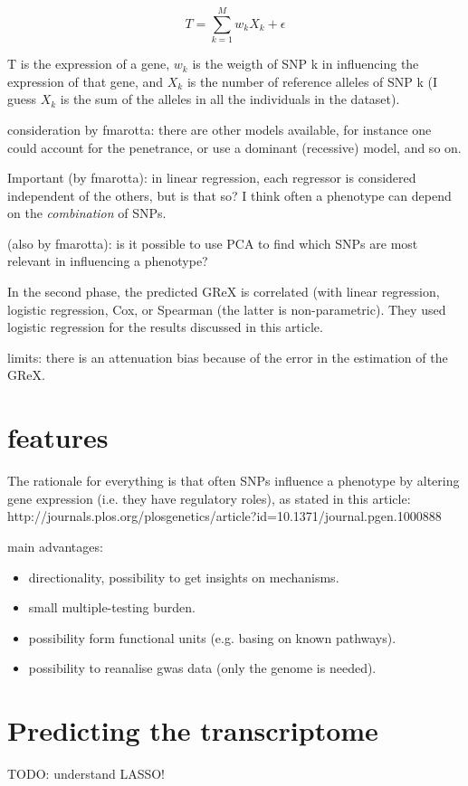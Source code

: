 \documentclass[../main.tex]{subfiles}
\begin{document}
\begin{equation}
	T = \sum_{k=1}^{M}{w_k X_k + \epsilon}
\end{equation}

T is the expression of a gene, $w_k$ is the weigth of SNP k in influencing the
expression of that gene, and $X_k$ is the number of reference alleles of SNP k
(I guess $X_k$ is the sum of the alleles in all the individuals in the
dataset).

consideration by fmarotta: there are other models available, for instance one
could account for the penetrance, or use a dominant (recessive) model, and so
on.

Important (by fmarotta): in linear regression, each regressor is considered
independent of the others, but is that so? I think often a phenotype can depend
on the \textit{combination} of SNPs.

(also by fmarotta): is it possible to use PCA to find which SNPs are most
relevant in influencing a phenotype?

In the second phase, the predicted GReX is correlated (with linear regression,
logistic regression, Cox, or Spearman (the latter is non-parametric). They used
logistic regression for the results discussed in this article.

limits: there is an attenuation bias because of the error in the estimation of
the GReX.

\section{features}

The rationale for everything is that often SNPs influence a phenotype by
altering gene expression (i.e. they have regulatory roles), as stated in this
article:
http://journals.plos.org/plosgenetics/article?id=10.1371/journal.pgen.1000888

main advantages:

\begin{itemize}
\item directionality, possibility to get insights on mechanisms.
\item small multiple-testing burden.
\item possibility form functional units (e.g. basing on known pathways).
\item possibility to reanalise gwas data (only the genome is needed).
\end{itemize}

\section{Predicting the transcriptome}

TODO: understand LASSO!
\end{document}
